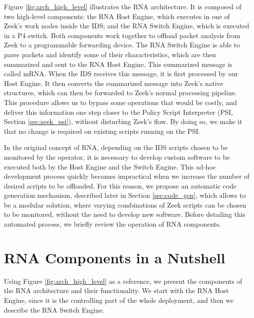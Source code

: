 Figure \ref{fig:arch_high_level} illustrates the RNA architecture. It is composed of two high-level components: the RNA Host Engine, which executes in one of Zeek's work nodes inside the IDS; and the RNA Switch Engine, which is executed in a P4 switch. Both components work together to offload packet analysis from Zeek to a programmable forwarding device. The RNA Switch Engine is able to parse packets and identify some of their characteristics, which are then summarized and sent to the RNA Host Engine. This summarized message is called mRNA. When the IDS receives this message, it is first processed by our Host Engine. It then converts the summarized message into Zeek's native structures, which can then be forwarded to Zeek's normal processing pipeline. This procedure allows us to bypass some operations that would be costly, and deliver this information one step closer to the Policy Script Interpreter (PSI, Section \ref{sec:zeek_psi}), without disturbing Zeek's flow. By doing so, we make it that no change is required on existing scripts running on the PSI.

In the original concept of RNA, depending on the IDS scripts chosen to be monitored by the operator, it is necessary to develop custom software to be executed both by the Host Engine and the Switch Engine. This ad-hoc development process quickly becomes impractical when we increase the number of desired scripts to be offloaded. For this reason, we propose an automatic code generation mechanism, described later in Section \ref{sec:code_gen}, which allows \TheSolutionName{} to be a modular solution, where varying combinations of Zeek scripts can be chosen to be monitored, without the need to develop new software. Before detailing this automated process, we briefly review the operation of RNA components.

\section{RNA Components in a Nutshell}

Using Figure \ref{fig:arch_high_level} as a reference, we present the components of the RNA architecture and their functionality. We start with the RNA Host Engine, since it is the controlling part of the whole deployment, and then we describe the RNA Switch Engine.

